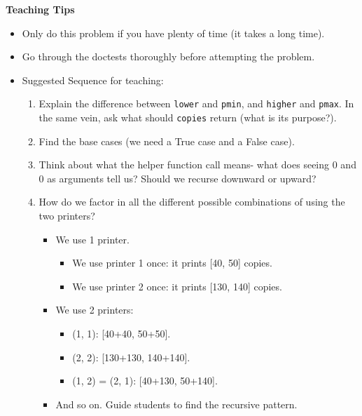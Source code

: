 \begin{blocksection}
\begin{guide}
\textbf{Teaching Tips}
\begin{itemize}
    \item Only do this problem if you have plenty of time (it takes a long time).
    \item Go through the doctests thoroughly before attempting the problem.
    \item Suggested Sequence for teaching:
    \begin{enumerate}
        \item Explain the difference between \lstinline{lower} and \lstinline{pmin}, and \lstinline{higher} and \lstinline{pmax}. In the same vein, ask what should \lstinline{copies} return (what is its purpose?).
        \item Find the base cases (we need a True case and a False case).
        \item Think about what the helper function call means- what does seeing 0 and 0 as arguments tell us? Should we recurse downward or upward?
        \item How do we factor in all the different possible combinations of using the two printers?
        \begin{itemize}
            \item We use 1 printer.
            \begin{itemize}
                \item We use printer 1 once: it prints [40, 50] copies.
                \item We use printer 2 once: it prints [130, 140] copies.
            \end{itemize}
            \item We use 2 printers:
            \begin{itemize}
                \item (1, 1): [40+40, 50+50].
                \item (2, 2): [130+130, 140+140].
                \item (1, 2) = (2, 1): [40+130, 50+140].
            \end{itemize}
            \item And so on. Guide students to find the recursive pattern.

        \end{itemize}
    \end{enumerate}
\end{itemize}
\end{guide}
\end{blocksection}
